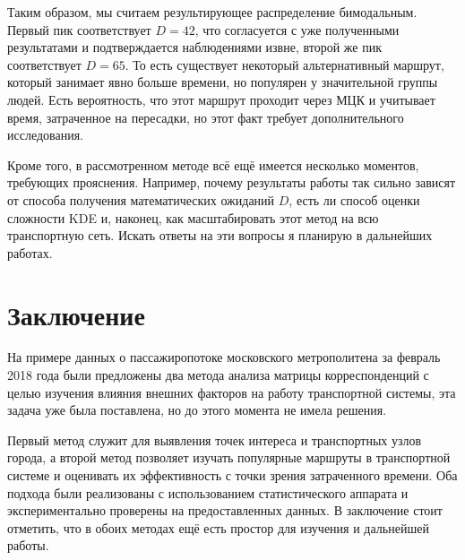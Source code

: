 \documentclass[12pt, fleqn, titlepage]{article}
\begin{document}
    Таким образом, мы считаем результирующее распределение бимодальным. Первый пик соответствует $D = 42$, что согласуется с уже полученными 
    результатами и подтверждается наблюдениями извне, второй же пик соответствует $D = 65$. То есть существует некоторый альтернативный маршрут, 
    который занимает явно больше времени, но популярен у значительной группы людей. Есть вероятность, что этот маршрут проходит через МЦК и 
    учитывает время, затраченное на пересадки, но этот факт требует дополнительного исследования.

    Кроме того, в рассмотренном методе всё ещё имеется несколько моментов, требующих прояснения. Например, почему результаты работы так 
    сильно зависят от способа получения математических ожиданий $D$, есть ли способ оценки сложности KDE и, наконец, как масштабировать этот 
    метод на всю транспортную сеть. Искать ответы на эти вопросы я планирую в дальнейших работах.

    \section{Заключение}

    На примере данных о пассажиропотоке московского метрополитена за февраль 2018 года были предложены два метода анализа 
    матрицы корреспонденций с целью изучения влияния внешних факторов на работу транспортной системы, эта задача уже 
    была поставлена, но до этого момента не имела решения. 
    
    Первый метод служит для 
    выявления точек интереса и транспортных узлов города, а второй метод позволяет изучать популярные маршруты в транспортной 
    системе и оценивать их эффективность с точки зрения затраченного времени. Оба подхода были реализованы с использованием 
    статистического аппарата и экспериментально проверены на предоставленных данных. В заключение стоит отметить, что 
    в обоих методах ещё есть простор для изучения и дальнейшей работы. 

    \newpage
    
    
\end{document}
